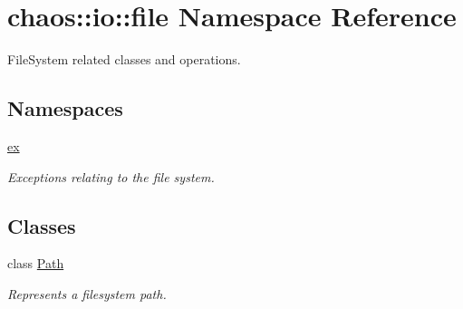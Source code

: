 \hypertarget{namespacechaos_1_1io_1_1file}{}\section{chaos\+:\+:io\+:\+:file Namespace Reference}
\label{namespacechaos_1_1io_1_1file}


File\+System related classes and operations.  


\subsection*{Namespaces}
\begin{DoxyCompactItemize}
\item 
 \hyperlink{namespacechaos_1_1io_1_1file_1_1ex}{ex}
\begin{DoxyCompactList}\small\item\em Exceptions relating to the file system. \end{DoxyCompactList}\end{DoxyCompactItemize}
\subsection*{Classes}
\begin{DoxyCompactItemize}
\item 
class \hyperlink{classchaos_1_1io_1_1file_1_1_path}{Path}
\begin{DoxyCompactList}\small\item\em Represents a filesystem path. \end{DoxyCompactList}\end{DoxyCompactItemize}
